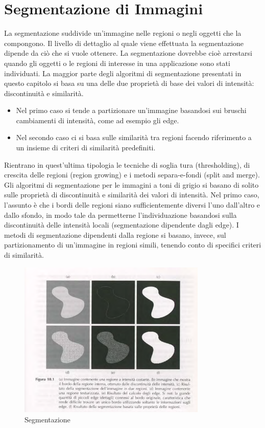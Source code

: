 \documentclass[12pt]{article}
\begin{document}
\section{Segmentazione di Immagini}
La segmentazione suddivide un'immagine nelle regioni o negli oggetti che la compongono. Il livello di dettaglio al quale viene effettuata la segmentazione dipende da ciò che si vuole ottenere. La segmentazione dovrebbe cioè arrestarsi quando gli oggetti o le regioni di interesse in una applicazione sono stati individuati. La maggior parte degli algoritmi di segmentazione presentati in questo capitolo si basa su una delle due proprietà di base dei valori di intensità: discontinuità e similarità.
\begin{itemize}
    \item Nel primo caso si tende a partizionare un'immagine basandosi sui bruschi cambiamenti di intensità, come ad esempio gli edge.
    \item  Nel secondo caso ci si basa sulle similarità tra regioni facendo riferimento a un insieme di criteri di similarità predefiniti.
\end{itemize}
Rientrano in quest'ultima tipologia le tecniche di soglia tura (thresholding), di crescita delle regioni
(region growing) e i metodi separa-e-fondi (split and merge).\\
Gli algoritmi di segmentazione per le immagini a toni di grigio si basano di solito
sulle proprietà di discontinuità e similarità dei valori di intensità. Nel primo caso, l'assunto è che i bordi delle regioni siano sufficientemente diversi l'uno dall'altro e dallo sfondo, in modo tale da permetterne l'individuazione basandosi sulla discontinuità delle intensità locali (segmentazione dipendente dagli edge). I metodi di segmentazione dipendenti dalla regione si basano, invece, sul partizionamento di un'immagine in regioni simili, tenendo conto di specifici criteri di similarità.
\begin{figure}[!htb]
    \centering
    \includegraphics[width=0.8\textwidth]{Images/seg.png}
    \caption{Segmentazione}
\end{figure}
\end{document}
